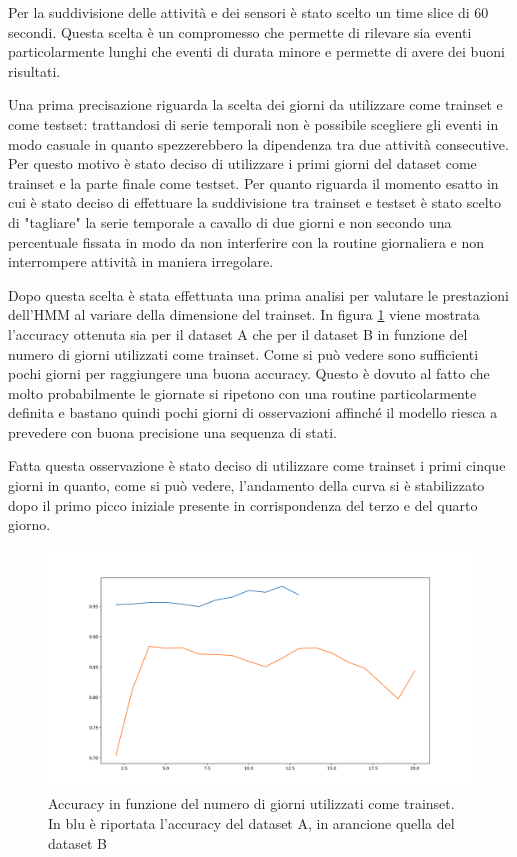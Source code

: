\documentclass[10pt,a4paper]{article}
\begin{document}
	Per la suddivisione delle attività e dei sensori è stato scelto un time slice di 60 secondi. Questa scelta è un compromesso che permette di rilevare sia eventi particolarmente lunghi che eventi di durata minore e permette di avere dei buoni risultati.
	
	Una prima precisazione riguarda la scelta dei giorni da utilizzare come trainset e come testset: trattandosi di serie temporali non è possibile scegliere gli eventi in modo casuale in quanto spezzerebbero la dipendenza tra due attività consecutive. Per questo motivo è stato deciso di utilizzare i primi giorni del dataset come trainset e la parte finale come testset.	
	Per quanto riguarda il momento esatto in cui è stato deciso di effettuare la suddivisione tra trainset e testset è stato scelto di "tagliare" la serie temporale a cavallo di due giorni e non secondo una percentuale fissata in modo da non interferire con la routine giornaliera e non interrompere attività in maniera irregolare.
	
	Dopo questa scelta è stata effettuata una prima analisi per valutare le prestazioni dell'HMM al variare della dimensione del trainset. In figura \ref{fig:traintestrate} viene mostrata l'accuracy ottenuta sia per il dataset A che per il dataset B in funzione del numero di giorni utilizzati come trainset.
	Come si può vedere sono sufficienti pochi giorni per raggiungere una buona accuracy. Questo è dovuto al fatto che molto probabilmente le giornate si ripetono con una routine particolarmente definita e bastano quindi pochi giorni di osservazioni affinché il modello riesca a prevedere con buona precisione una sequenza di stati.
	
	Fatta questa osservazione è stato deciso di utilizzare come trainset i primi cinque giorni in quanto, come si può vedere, l'andamento della curva si è stabilizzato dopo il primo picco iniziale presente in corrispondenza del terzo e del quarto giorno. 
	
	\begin{figure}
	\includegraphics[width=\linewidth]{immagini/traintestrate.png}
	\caption{Accuracy in funzione del numero di giorni utilizzati come trainset. In blu è riportata l'accuracy del dataset A, in arancione quella del dataset B}
	\label{fig:traintestrate}
	\end{figure}
	
\end{document}
